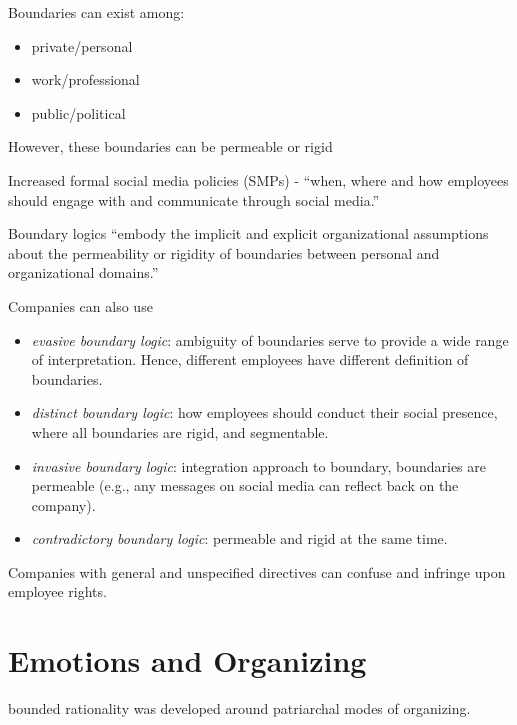 \documentclass[
]{book}
\providecommand{\tightlist}{%
  \setlength{\itemsep}{0pt}\setlength{\parskip}{0pt}}
\begin{document}
\citep{Banghart_2018}

Boundaries can exist among:

\begin{itemize}
\tightlist
\item
  private/personal
\item
  work/professional
\item
  public/political
\end{itemize}

However, these boundaries can be permeable or rigid

Increased formal social media policies (SMPs) - ``when, where and how employees should engage with and communicate
through social media.'' \citep{Vaast_2013}

Boundary logics ``embody the implicit and explicit organizational assumptions about the permeability or rigidity of
boundaries between personal and organizational domains.''

Companies can also use

\begin{itemize}
\tightlist
\item
  \emph{evasive boundary logic}: ambiguity of boundaries serve to provide a wide range of interpretation. Hence, different
  employees have different definition of boundaries.
\item
  \emph{distinct boundary logic}: how employees should conduct their social presence, where all boundaries are rigid, and
  segmentable.
\item
  \emph{invasive boundary logic}: integration approach to boundary, boundaries are permeable (e.g., any messages on social
  media can reflect back on the company).
\item
  \emph{contradictory boundary logic}: permeable and rigid at the same time.
\end{itemize}

Companies with general and unspecified directives can confuse and infringe upon employee rights.

\hypertarget{emotions-and-organizing}{%
\chapter{Emotions and Organizing}\label{emotions-and-organizing}}

\citep{Mumby_1992}

bounded rationality was developed around patriarchal modes of
organizing.
\end{document}
